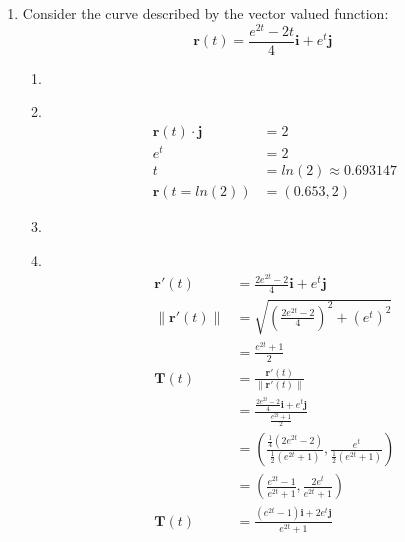 \documentclass[11pt]{article}
\newcommand\Item[1][]{%
  \ifx\relax#1\relax  \item \else \item[#1] \fi
  \abovedisplayskip=0pt\abovedisplayshortskip=0pt~\vspace*{-\baselineskip}}
\begin{document}
\begin{enumerate}
\begin{enumerate}
          \end{enumerate}
    \item Consider the curve described by the vector valued function:\\
          $$\textbf{r}(t) = \frac{e^{2t}-2t}{4}\textbf{i} + e^t\textbf{j}$$
          \begin{enumerate}
              \Item
              \begin{align*}
                  \textbf{r}(t){\cdot}\textbf{j} & =2                       \\
                  e^t                            & = 2                      \\
                  t                              & = ln(2) \approx 0.693147 \\
                  \textbf{r}\left(t=ln(2)\right) & = (0.653,2)
              \end{align*}

              \Item
              \begin{align*}
                  \textbf{r}'(t)       & = \frac{2e^{2t} - 2}{4}\textbf{i} + e^t\textbf{j}                                                                                        \\
                  \| \textbf{r}'(t) \| & = \sqrt{\left(\frac{2e^{2t} - 2}{4}\right)^2 + (e^t)^2}                                                                                  \\
                                       & = \frac{e^{2t}+1}{2}                                                                                                                     \\
                  \textbf{T}(t)        & = \frac{\textbf{r}'(t)}{\| \textbf{r}'(t) \|}                                                                                            \\
                                       & =         \frac{\frac{2e^{2t} - 2}{4}\textbf{i} + e^t\textbf{j}}{\frac{e^{2t}+1}{2}}                                                     \\
                                       & = \left(\frac{\frac{1}{4}\left(2e^{2t}-2\right)}{\frac{1}{2}\left(e^{2t}+1\right)},\frac{e^{t}}{\frac{1}{2}\left(e^{2t}+1\right)}\right) \\
                                       & = \left(\frac{e^{2t}-1}{e^{2t}+1},\frac{2e^{t}}{e^{2t}+1}\right)                                                                         \\
                  \textbf{T}(t)        & = \frac{(e^{2t}-1)\textbf{i} + 2e^t\textbf{j}}{e^{2t}+1}
              \end{align*}


\end{enumerate}
\end{enumerate}
\end{document}
